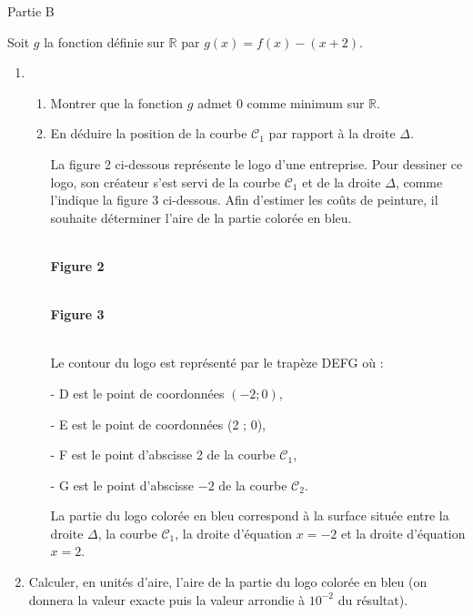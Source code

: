 \begin{h3}Partie B\end{h3}
Soit $g$ la fonction définie sur $\mathbb{R}$ par $g\left(x\right)=f\left(x\right)-\left(x+2\right)$.
\begin{enumerate}
     \item
     \begin{enumerate}[label=\alph*.]
          \item
          Montrer que la fonction $g$ admet $0$ comme minimum sur $\mathbb{R}$.
          \item
          En déduire la position de la courbe $\mathscr C_{1}$ par rapport à la droite $\Delta $.
          \par
          La figure 2 ci-dessous représente le logo d'une entreprise. Pour dessiner ce logo, son créateur s'est servi de la courbe $\mathscr C_{1}$ et de la droite $\Delta $, comme l'indique la figure 3 ci-dessous. Afin d'estimer les coûts de peinture, il souhaite déterminer l'aire de la partie colorée en bleu.

\begin{center}
\\ \textbf{Figure 2}
\end{center}
\bigskip
\begin{center}
\\ \textbf{Figure 3}
\end{center}
\\

          Le contour du logo est représenté par le trapèze DEFG où :
          \par
          - D est le point de coordonnées $\left(-2 ; 0\right)$,
          \par
          - E est le point de coordonnées (2 ; 0),
          \par
          - F est le point d'abscisse 2 de la courbe $\mathscr C_{1}$,
          \par
          - G est le point d'abscisse $-2$ de la courbe $\mathscr C_{2}$.
          \par
     La partie du logo colorée en bleu correspond à la surface située entre la droite $\Delta $, la courbe $\mathscr C_{1}$, la droite d'équation $x =-2$ et la droite d'équation $x=2$.\end{enumerate}
     \item
Calculer, en unités d'aire, l'aire de la partie du logo colorée en bleu (on donnera la valeur exacte puis la valeur arrondie à $10^{-2}$ du résultat).\end{enumerate}
